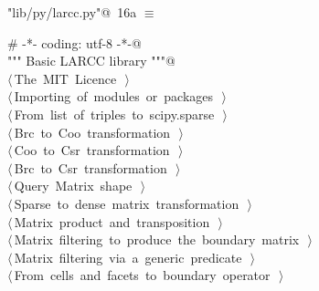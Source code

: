 \documentclass[11pt,oneside]{article}	%
\begin{document}
\begin{flushleft} \small
\begin{minipage}{\linewidth} \label{scrap30}
\protect{}\verb@"lib/py/larcc.py"@\nobreak\ {\footnotesize 16a }$\equiv$
\vspace{-1ex}
\begin{list}{}{} \item
\mbox{}\verb@# -*- coding: utf-8 -*-@\\
\mbox{}\verb@""" Basic LARCC library """@\\
\mbox{}\verb@@\hbox{$\langle\,$The MIT Licence\nobreak\ {\footnotesize {}}$\,\rangle$}\verb@@\\
\mbox{}\verb@@\hbox{$\langle\,$Importing of modules or packages\nobreak\ {\footnotesize {}}$\,\rangle$}\verb@@\\
\mbox{}\verb@@\hbox{$\langle\,$From list of triples to scipy.sparse\nobreak\ {\footnotesize {}}$\,\rangle$}\verb@@\\
\mbox{}\verb@@\hbox{$\langle\,$Brc to Coo transformation\nobreak\ {\footnotesize {}}$\,\rangle$}\verb@@\\
\mbox{}\verb@@\hbox{$\langle\,$Coo to Csr transformation\nobreak\ {\footnotesize {}}$\,\rangle$}\verb@@\\
\mbox{}\verb@@\hbox{$\langle\,$Brc to Csr transformation\nobreak\ {\footnotesize {}}$\,\rangle$}\verb@@\\
\mbox{}\verb@@\hbox{$\langle\,$Query Matrix shape\nobreak\ {\footnotesize {}}$\,\rangle$}\verb@@\\
\mbox{}\verb@@\hbox{$\langle\,$Sparse to dense matrix transformation\nobreak\ {\footnotesize {}}$\,\rangle$}\verb@@\\
\mbox{}\verb@@\hbox{$\langle\,$Matrix product and transposition\nobreak\ {\footnotesize {}}$\,\rangle$}\verb@@\\
\mbox{}\verb@@\hbox{$\langle\,$Matrix filtering to produce the boundary matrix\nobreak\ {\footnotesize {}}$\,\rangle$}\verb@@\\
\mbox{}\verb@@\hbox{$\langle\,$Matrix filtering via a generic predicate\nobreak\ {\footnotesize {}}$\,\rangle$}\verb@@\\
\mbox{}\verb@@\hbox{$\langle\,$From cells and facets to boundary operator\nobreak\ {\footnotesize {}}$\,\rangle$}\verb@@\\

\end{list}
\end{minipage}
\end{flushleft}
\end{document}
